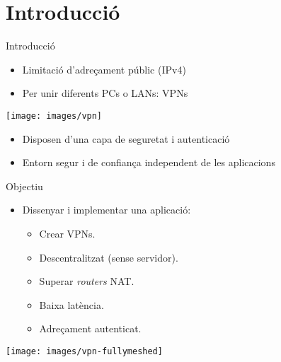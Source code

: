 \section{Introducció}
    \begin{frame}{Introducció}
        \begin{itemize}
\item Limitació d'adreçament públic (IPv4)
\item Per unir diferents PCs o LANs: VPNs
        \end{itemize}
        \begin{center}
        \texttt{[image: images/vpn]}
        \end{center}
        \begin{itemize}
\item Disposen d'una capa de seguretat i autenticació
\item Entorn segur i de confiança independent de les aplicacions
        \end{itemize}
    \end{frame}
    \begin{frame}{Objectiu}
        \begin{itemize}
\item Dissenyar i implementar una aplicació:
            \begin{itemize}
\item Crear VPNs.
\item Descentralitzat (sense servidor).
\item Superar \emph{routers} NAT.
\item Baixa latència.
\item Adreçament autenticat.
            \end{itemize}
        \end{itemize}
        \begin{center}
        \texttt{[image: images/vpn-fullymeshed]}
        \end{center}
    \end{frame}
